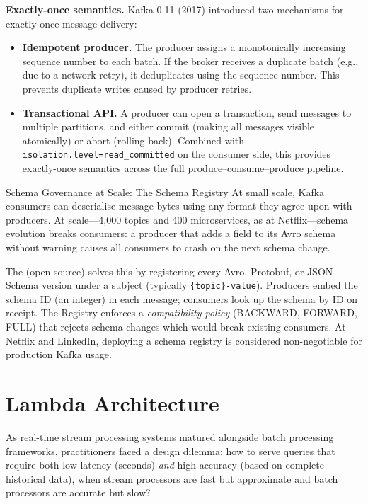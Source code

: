 \textbf{Exactly-once semantics.} Kafka 0.11 (2017) introduced two
mechanisms for exactly-once message delivery:
\begin{itemize}
  \item \textbf{Idempotent producer.} The producer assigns a monotonically
        increasing sequence number to each batch. If the broker receives
        a duplicate batch (e.g., due to a network retry), it deduplicates
        using the sequence number. This prevents duplicate writes caused
        by producer retries.
  \item \textbf{Transactional API.} A producer can open a transaction,
        send messages to multiple partitions, and either commit (making
        all messages visible atomically) or abort (rolling back). Combined
        with \texttt{isolation.level=read\_committed} on the consumer side,
        this provides exactly-once semantics across the full
        produce--consume--produce pipeline.
\end{itemize}

\begin{techdebt}{Schema Governance at Scale: The Schema Registry}
At small scale, Kafka consumers can deserialise message bytes using
any format they agree upon with producers. At scale---4{,}000 topics
and 400 microservices, as at Netflix---schema evolution breaks consumers:
a producer that adds a field to its Avro schema without warning causes
all consumers to crash on the next schema change.

The  (open-source) solves this by
registering every Avro, Protobuf, or JSON Schema version under a
subject (typically \texttt{\{topic\}-value}). Producers embed the
schema ID (an integer) in each message; consumers look up the schema
by ID on receipt. The Registry enforces a \emph{compatibility policy}
(BACKWARD, FORWARD, FULL) that rejects schema changes which would break
existing consumers. At Netflix and LinkedIn, deploying a schema registry
is considered non-negotiable for production Kafka usage.
\end{techdebt}

\section{Lambda Architecture}
\label{sec:lambda}

As real-time stream processing systems matured alongside batch processing
frameworks, practitioners faced a design dilemma: how to serve queries that
require both low latency (seconds) \emph{and} high accuracy (based on
complete historical data), when stream processors are fast but approximate
and batch processors are accurate but slow?

